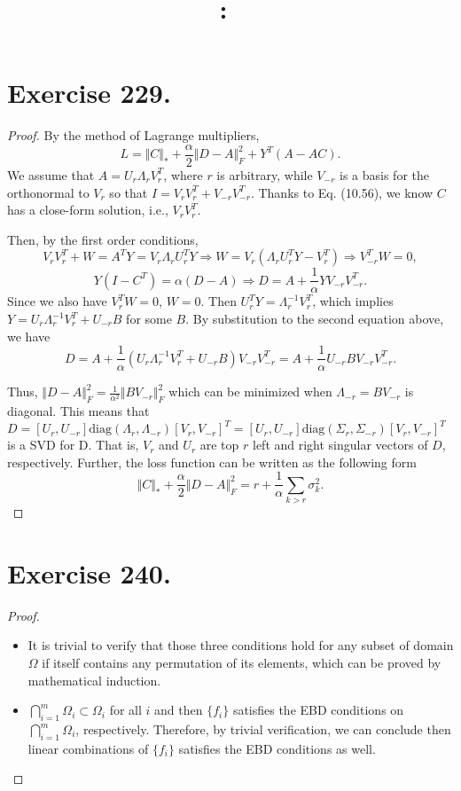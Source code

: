 \documentclass{article}
\date{}
\title{
    \textmd{\textbf{\hmwkClass:\ \hmwkTitle}}\\
}
\author{\hmwkAuthorName}
\begin{document}
\maketitle
\section{Exercise 229.}
\begin{proof}
By the method of Lagrange multipliers,
$$
L = \Vert C \Vert_{*} + \frac{\alpha}{2} \Vert D - A \Vert_F^{2} + Y^{T}(A-AC).
$$
We assume that $A = U_r\Lambda_r V_r^{T}$, where $r$ is arbitrary, while $V_{-r}$ is a basis for the orthonormal to $V_r$ so that $I = V_rV_r^{T} + V_{-r}V_{-r}^{T}$. Thanks to Eq. (10.56), we know $C$ has a close-form solution, i.e., $V_rV_r^{T}$.  

Then, by the first order conditions, 
$$
V_rV_r^{T} + W = A^{T}Y =  V_r\Lambda_r U_r^{T}Y \Rightarrow W = V_r(\Lambda_r U_r^{T}Y - V_r^{T}) \Rightarrow V_{-r}^{T}W = 0,
$$
$$
Y(I-C^{T}) = \alpha(D-A) \Rightarrow D = A + \frac{1}{\alpha} YV_{-r}V_{-r}^{T}. 
$$
Since we also have $V_r^{T}W = 0$, $W = 0$. Then $U_r^{T}Y = \Lambda_r^{-1}V_r^{T}$, which implies $Y = U_r\Lambda_r^{-1} V_r^{T} + U_{-r}B$ for some $B$. By substitution to the second equation above, we have 
$$
D = A + \frac{1}{\alpha}(U_r\Lambda_r^{-1}V_r^{T} + U_{-r}B)V_{-r}V_{-r}^{T} = A + \frac{1}{\alpha} U_{-r}BV_{-r}V_{-r}^{T}.
$$

Thus, $\Vert D -A \Vert_F^2 = \frac{1}{\alpha^2}\Vert BV_{-r} \Vert_F^2$ which can be minimized when $\Lambda_{-r} = BV_{-r}$ is diagonal. This means that $D = [U_r,U_{-r}]\text{diag}(\Lambda_r,\Lambda_{-r})[V_r, V_{-r}]^T = [U_r,U_{-r}]\text{diag}(\Sigma_r,\Sigma_{-r})[V_r, V_{-r}]^T$ is a SVD for D. That is, $V_r$ and $U_r$ are top $r$ left and right singular vectors of $D$, respectively. Further, the loss function can be written as the following form
$$
\Vert C \Vert_{*} + \frac{\alpha}{2} \Vert D - A \Vert_F^{2} = r + \frac{1}{\alpha}\sum_{k>r}\sigma_k^2.
$$
\end{proof}

\section{Exercise 240.}
\begin{proof}

\begin{itemize}
    \item It is trivial to verify that those three conditions hold for any subset of domain $\Omega$ if itself contains any permutation of its elements, which can be proved by mathematical induction.
    \item $\bigcap_{i=1}^{m}\Omega_i \subset \Omega_i$ for all $i$ and then $\{f_i\}$ satisfies the EBD conditions on $\bigcap_{i=1}^{m}\Omega_i$, respectively. Therefore, by trivial verification, we can conclude then linear combinations of  $\{f_i\}$ satisfies the EBD conditions as well.
\end{itemize}
\end{proof}
\end{document}
